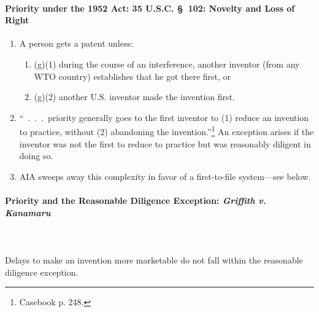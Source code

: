 \paragraph{Priority under the 1952 Act: 35 U.S.C. \S\ 102: Novelty and Loss of 
Right}

\begin{enumerate}
    \item A person gets a patent unless:
    \begin{enumerate}
        \item (g)(1) during the course of an interference, another inventor (from 
        any WTO country) establishes that he got there first, or
        \item (g)(2) another U.S. inventor made the invention first.
    \end{enumerate}
    \item ``~.~.~.~priority generally goes to the first inventor to (1) reduce 
    an invention to practice, without (2) abandoning the 
    invention.''\footnote{Casebook p. 248.} An exception arises if the inventor 
    was not the first to reduce to practice but was reasonably diligent in doing 
    so.
    \item AIA sweeps away this complexity in favor of a first-to-file 
    system---see below. 
\end{enumerate}

\paragraph{Priority and the Reasonable Diligence Exception: \emph{Griffith v. 
Kanamaru}}
~\\\\
Delays to make an invention more marketable do not fall within the reasonable 
diligence exception.

